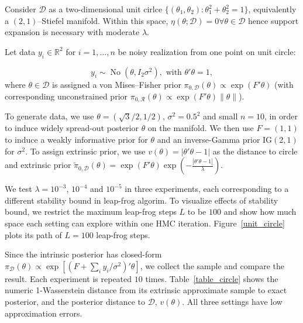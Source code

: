 \documentclass[10pt]{article}
\newcommand{\mc}[1]{\mathcal{#1}}
\DeclareMathOperator{\No}{No}
\DeclareMathOperator{\1}{\mathbbm{1}}
\begin{document}
Consider $\mc D$ as a two-dimensional unit cirlce $\{(\theta_1,\theta_2):\theta_1^2+\theta_2^2=1\}$, equivalently a $(2,1)$--Stiefel manifold. Within this space, $\eta(\theta;\mc D) =0 \forall \theta\in \mc D$ hence support expansion is necessary with moderate $\lambda$.

Let data $y_i\in \mathbb{R}^2$ for $i=1,\ldots,n$  be noisy realization from one point on unit circle:

$$y_i\sim \No(\theta, I_2\sigma^2),\text{ with } \theta'\theta=1,$$
where $\theta \in \mc D$ is assigned a von Mises--Fisher prior $\pi_{0,\mc D}(\theta) \propto \exp(F'\theta)$ (with corresponding unconstrained prior $\pi_{0,\mc R}(\theta) \propto \exp(F'\theta)\|\theta\|$).

 To generate data, we use $\theta= (\sqrt 3/2, 1/2)$, $\sigma^2=0.5^2$ and small $n=10$, in order to induce widely spread-out posterior $\theta$ on the manifold. We then use $F=(1,1)$ to induce a weakly informative prior for $\theta$ and an inverse-Gamma prior $\text{IG}(2,1)$ for $\sigma^2$. To assign extrinsic prior, we use $v(\theta)=|\theta'\theta -1|$ as the distance to circle and extrinsic prior $\tilde\pi_{0,\mc D}(\theta)= \exp(F'\theta) \exp(-\frac{|\theta'\theta -1|}{\lambda})$.

We test $\lambda = 10^{-3}$, $10^{-4}$ and $10^{-5}$ in three experiments, each corresponding to a different stability bound in leap-frog algorim. To visualize effects of stability bound, we restrict the maximum leap-frog steps $L$ to be $100$ and show how much space each setting can explore within one HMC iteration. Figure~\ref{unit_circle} plots its path of $L=100$ leap-frog steps.

Since the intrinsic posterior has closed-form $\pi_{\mc D}(\theta)\propto \exp [(F+\sum_i y_i/\sigma^2)'\theta]$, we collect the sample and compare the result. Each experiment is repeated $10$ times. Table~\ref{table_circle} shows the numeric 1-Wasserstein distance from its extrinsic approximate sample to exact posterior, and the posterior distance to $\mc D$, $v(\theta)$. All three settings have low approximation errors.
\end{document}
